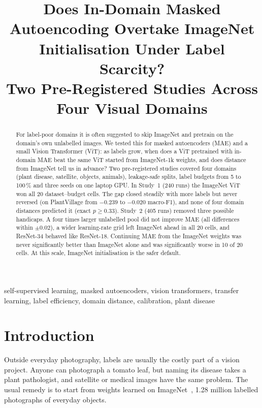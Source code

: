 \documentclass[conference]{IEEEtran}
\begin{document}
\title{Does In-Domain Masked Autoencoding Overtake ImageNet Initialisation Under Label Scarcity?\\
Two Pre-Registered Studies Across Four Visual Domains}

\author{
}

\maketitle

\begin{abstract}
For label-poor domains it is often suggested to skip ImageNet and pretrain on the domain's own unlabelled images.
We tested this for masked autoencoders (MAE) and a small Vision Transformer (ViT): as labels grow, when does a ViT
pretrained with in-domain MAE beat the same ViT started from ImageNet-1k weights, and does distance from ImageNet
tell us in advance? Two pre-registered studies covered four domains (plant disease, satellite, objects, animals),
leakage-safe splits, label budgets from 5 to 100\,\% and three seeds on one laptop GPU. In Study~1 (240 runs) the
ImageNet ViT won all 20 dataset--budget cells. The gap closed steadily with more labels but never reversed (on
PlantVillage from $-0.239$ to $-0.020$ macro-F1), and none of four domain distances predicted it (exact
$p \geq 0.33$). Study~2 (405 runs) removed three possible handicaps. A four times larger unlabelled pool did not
improve MAE (all differences within $\pm 0.02$), a wider learning-rate grid left ImageNet ahead in all 20 cells,
and ResNet-34 behaved like ResNet-18. Continuing MAE from the ImageNet weights was never significantly better than
ImageNet alone and was significantly worse in 10 of 20 cells. At this scale, ImageNet initialisation is the safer
default.
\end{abstract}

\begin{IEEEkeywords}
self-supervised learning, masked autoencoders, vision transformers, transfer learning, label efficiency,
domain distance, calibration, plant disease
\end{IEEEkeywords}

\section{Introduction}
Outside everyday photography, labels are usually the costly part of a vision project. Anyone can photograph a
tomato leaf, but naming its disease takes a plant pathologist, and satellite or medical images have the same
problem. The usual remedy is to start from weights learned on ImageNet~\cite{deng2009imagenet}, 1.28 million
labelled photographs of everyday objects.
\end{document}
